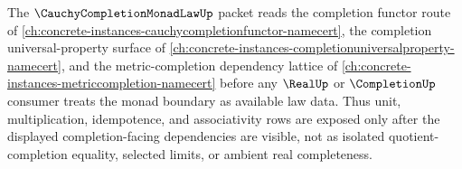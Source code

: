 The $\CauchyCompletionMonadLawUp$ packet reads the completion functor route of \autoref{ch:concrete-instances-cauchycompletionfunctor-namecert}, the completion universal-property surface of \autoref{ch:concrete-instances-completionuniversalproperty-namecert}, and the metric-completion dependency lattice of \autoref{ch:concrete-instances-metriccompletion-namecert} before any $\RealUp$ or $\CompletionUp$ consumer treats the monad boundary as available law data. Thus unit, multiplication, idempotence, and associativity rows are exposed only after the displayed completion-facing dependencies are visible, not as isolated quotient-completion equality, selected limits, or ambient real completeness.
